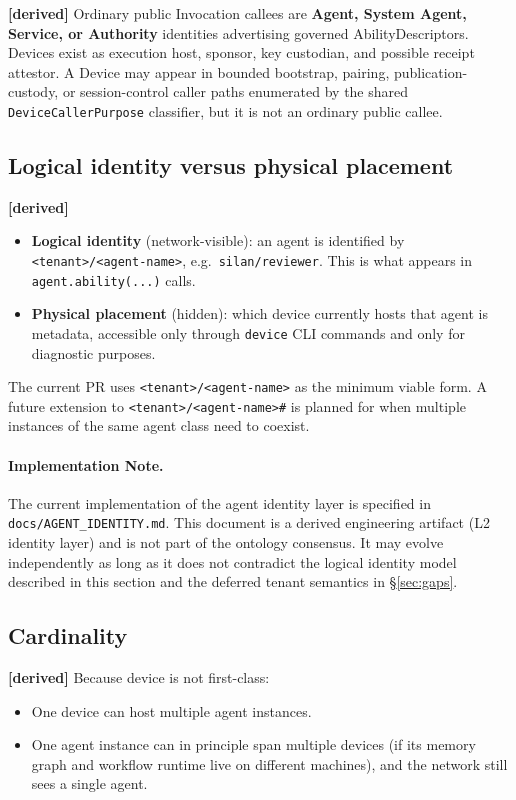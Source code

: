 \documentclass[11pt,a4paper]{article}
\newcommand{\derived}{\textcolor{derivedcolor}{\textbf{[derived]}}\xspace}
\begin{document}
\derived{} Ordinary public Invocation callees are \textbf{Agent, System Agent,
Service, or Authority} identities advertising governed AbilityDescriptors.
Devices exist as execution host, sponsor, key custodian, and possible receipt
attestor. A Device may appear in bounded bootstrap, pairing,
publication-custody, or session-control caller paths enumerated by the shared
\texttt{DeviceCallerPurpose} classifier, but it is not an ordinary public
callee.

\subsection{Logical identity versus physical placement}

\derived{}
\begin{itemize}[leftmargin=2em,itemsep=0.4em]
    \item \textbf{Logical identity} (network-visible): an agent is identified
    by \texttt{<tenant>/<agent-name>}, e.g.\ \texttt{silan/reviewer}. This is
    what appears in \texttt{agent.ability(...)} calls.
    \item \textbf{Physical placement} (hidden): which device currently hosts
    that agent is metadata, accessible only through \texttt{device} CLI
    commands and only for diagnostic purposes.
\end{itemize}

The current PR uses \texttt{<tenant>/<agent-name>} as the minimum viable form.
A future extension to \texttt{<tenant>/<agent-name>\#<instance-id>} is planned
for when multiple instances of the same agent class need to coexist.

\paragraph{Implementation Note.}
The current implementation of the agent identity layer is specified in
\texttt{docs/AGENT\_IDENTITY.md}. This document is a derived engineering
artifact (L2 identity layer) and is not part of the ontology consensus.
It may evolve independently as long as it does not contradict the logical
identity model described in this section and the deferred tenant semantics
in \S\ref{sec:gaps}.

\subsection{Cardinality}

\derived{} Because device is not first-class:
\begin{itemize}[leftmargin=2em,itemsep=0.3em]
    \item One device can host multiple agent instances.
    \item One agent instance can in principle span multiple devices (if its
    memory graph and workflow runtime live on different machines), and the
    network still sees a single agent.
\end{itemize}
\end{document}
